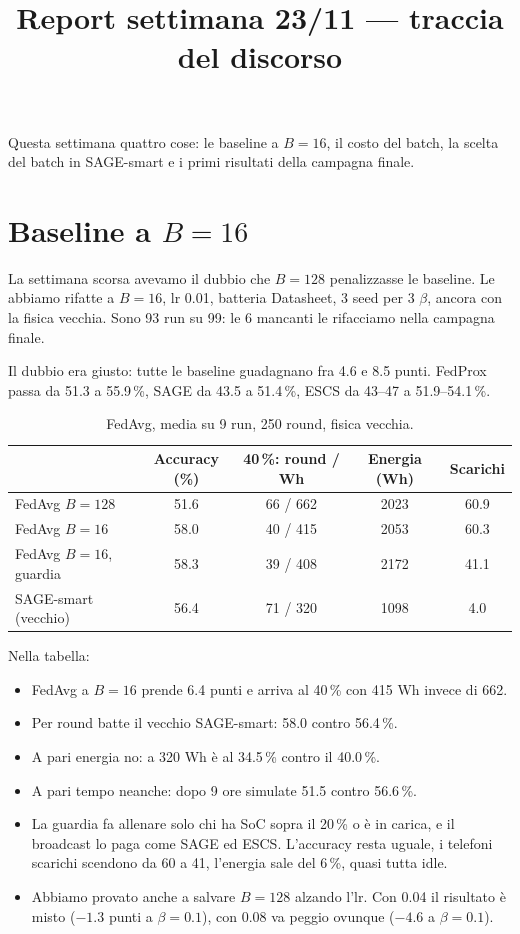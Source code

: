 \documentclass[10pt,a4paper]{article}
\title{\bfseries Report settimana 23/11 --- traccia del discorso}
\author{}
\date{}
\begin{document}
\maketitle
\vspace{-3.6em}

Questa settimana quattro cose: le baseline a $B = 16$, il costo del batch, la
scelta del batch in SAGE-smart e i primi risultati della campagna finale.

\section{Baseline a $B = 16$}

La settimana scorsa avevamo il dubbio che $B = 128$ penalizzasse le baseline.
Le abbiamo rifatte a $B = 16$, lr 0.01, batteria Datasheet, 3 seed per 3
$\beta$, ancora con la fisica vecchia. Sono 93 run su 99: le 6 mancanti le
rifacciamo nella campagna finale.

Il dubbio era giusto: tutte le baseline guadagnano fra 4.6 e 8.5 punti. FedProx
passa da 51.3 a 55.9\,\%, SAGE da 43.5 a 51.4\,\%, ESCS da 43--47 a
51.9--54.1\,\%.

\begin{table}[H]
  \centering\small
  \caption{FedAvg, media su 9 run, 250 round, fisica vecchia.}
  \begin{tabular}{lcccc}
    \toprule
    & Accuracy (\%) & 40\,\%: round / Wh & Energia (Wh) & Scarichi \\
    \midrule
    FedAvg $B = 128$              & 51.6 & 66 / 662 & 2023 & 60.9 \\
    FedAvg $B = 16$               & 58.0 & 40 / 415 & 2053 & 60.3 \\
    FedAvg $B = 16$, guardia      & 58.3 & 39 / 408 & 2172 & 41.1 \\
    SAGE-smart (vecchio)          & 56.4 & 71 / 320 & 1098 & 4.0 \\
    \bottomrule
  \end{tabular}
\end{table}

Nella tabella:
\begin{itemize}
  \item FedAvg a $B = 16$ prende 6.4 punti e arriva al 40\,\% con 415 Wh invece
        di 662.
  \item Per round batte il vecchio SAGE-smart: 58.0 contro 56.4\,\%.
  \item A pari energia no: a 320 Wh è al 34.5\,\% contro il 40.0\,\%.
  \item A pari tempo neanche: dopo 9 ore simulate 51.5 contro 56.6\,\%.
  \item La guardia fa allenare solo chi ha SoC sopra il 20\,\% o è in carica, e
        il broadcast lo paga come SAGE ed ESCS. L'accuracy resta uguale, i
        telefoni scarichi scendono da 60 a 41, l'energia sale del 6\,\%, quasi
        tutta idle.
  \item Abbiamo provato anche a salvare $B = 128$ alzando l'lr. Con 0.04 il
        risultato è misto ($-1.3$ punti a $\beta = 0.1$), con 0.08 va peggio
        ovunque ($-4.6$ a $\beta = 0.1$).
\end{itemize}
\end{document}
